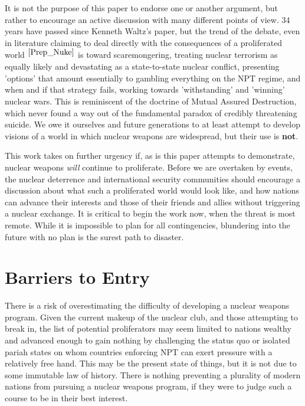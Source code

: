 \documentclass[journal]{IEEEtran}
\begin{document}
It is not the purpose of this paper to endorse one or another argument, but rather to encourage an active discussion with many different points of view.  34 years have passed since Kenneth Waltz's paper, but the trend of the debate, even in literature claiming to deal directly with the consequences of a proliferated world $^{\cite{Prep_Nuke}}$ is toward scaremongering, treating nuclear terrorism as equally likely and devastating as a state-to-state nuclear conflict, presenting 'options' that amount essentially to gambling everything on the NPT regime, and when and if that strategy fails, working towards 'withstanding' and 'winning' nuclear wars.  This is reminiscent of the doctrine of Mutual Assured Destruction, which never found a way out of the fundamental paradox of credibly threatening suicide.  We owe it ourselves and future generations to at least attempt to develop visions of a world in which nuclear weapons are widespread, but their use is \textbf{not}.\par
This work takes on further urgency if, as is this paper attempts to demonstrate, nuclear weapons \textit{will} continue to proliferate.  Before we are overtaken by events, the nuclear deterrence and international security communities should encourage a discussion about what such a proliferated world would look like, and how nations can advance their interests and those of their friends and allies without triggering a nuclear exchange.  It is critical to begin the work now, when the threat is most remote.  While it is impossible to plan for all contingencies, blundering into the future with no plan is the surest path to disaster.
\section{Barriers to Entry}
There is a risk of overestimating the difficulty of developing a nuclear weapons program.  Given the current makeup of the nuclear club, and those attempting to break in, the list of potential proliferators may seem limited to nations wealthy and advanced enough to gain nothing by challenging the status quo or isolated pariah states on whom countries enforcing NPT can exert pressure with a relatively free hand.  This may be the present state of things, but it is not due to some immutable law of history.  There is nothing preventing a plurality of modern nations from pursuing a nuclear weapons program, if they were to judge such a course to be in their best interest.
\end{document}
